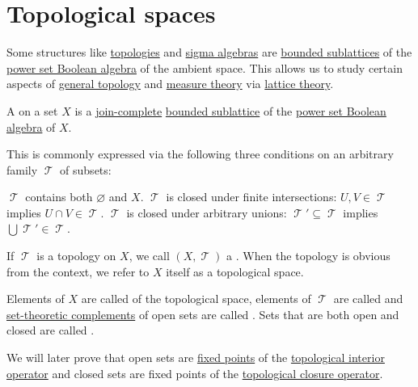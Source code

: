 \section{Topological spaces}\label{sec:topological_spaces}

\begin{remark}\label{rem:topologies_and_sigma_algebras_as_lattices}
  Some structures like \hyperref[def:topological_space]{topologies} and \hyperref[def:sigma_algebra]{sigma algebras} are \hyperref[def:lattice/submodel]{bounded sublattices} of the \hyperref[thm:boolean_algebra_of_subsets]{power set Boolean algebra} of the ambient space. This allows us to study certain aspects of \hyperref[ch:general_topology]{general topology} and \hyperref[ch:measure_theory]{measure theory} via \hyperref[sec:lattices]{lattice theory}.
\end{remark}

\begin{definition}\label{def:topological_space}
  A  on a set \( X \) is a \hyperref[def:lattice]{join-complete} \hyperref[def:lattice/submodel]{bounded sublattice} of the \hyperref[thm:boolean_algebra_of_subsets]{power set Boolean algebra} of \( X \).

  This is commonly expressed via the following three conditions on an arbitrary family \( \mscrT \) of subsets:
  \begin{thmenum}
     \( \mscrT \) contains both \( \varnothing \) and \( X \).
     \( \mscrT \) is closed under finite intersections: \( U, V \in \mscrT \) implies \( U \cap V \in \mscrT \).
     \( \mscrT \) is closed under arbitrary unions: \( \mscrT' \subseteq \mscrT \) implies \( \bigcup \mscrT' \in \mscrT \).
  \end{thmenum}

  If \( \mscrT \) is a topology on \( X \), we call \( (X, \mscrT) \) a . When the topology is obvious from the context, we refer to \( X \) itself as a topological space.

  Elements of \( X \) are called  of the topological space, elements of \( \mscrT \) are called  and \hyperref[thm:boolean_algebra_of_subsets/complement]{set-theoretic complements} of open sets are called . Sets that are both open and closed are called .
\end{definition}
\begin{comments}
  \item We will later prove that open sets are \hyperref[def:fixed_point]{fixed points} of the \hyperref[def:topological_interior_operator]{topological interior operator} and closed sets are fixed points of the \hyperref[def:topological_closure_operator]{topological closure operator}.
\end{comments}

